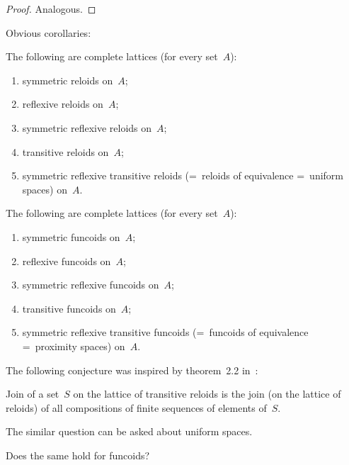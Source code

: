 \begin{proof}
Analogous.
\end{proof}

Obvious corollaries:

\begin{cor}
The following are complete lattices (for every set~$A$):
\begin{enumerate}
\item symmetric reloids on~$A$;
\item reflexive reloids on~$A$;
\item symmetric reflexive reloids on~$A$;
\item transitive reloids on~$A$;
\item symmetric reflexive transitive reloids (=~reloids of equivalence =~uniform spaces) on~$A$.
\end{enumerate}
\end{cor}

\begin{cor}
The following are complete lattices (for every set~$A$):
\begin{enumerate}
\item symmetric funcoids on~$A$;
\item reflexive funcoids on~$A$;
\item symmetric reflexive funcoids on~$A$;
\item transitive funcoids on~$A$;
\item symmetric reflexive transitive funcoids (=~funcoids of equivalence =~proximity spaces) on~$A$.
\end{enumerate}
\end{cor}

The following conjecture was inspired by theorem~2.2 in~\cite{Weber2007}:

\begin{conjecture}
Join of a set~$S$ on the lattice of transitive reloids is
the join (on the lattice of reloids) of all compositions of finite sequences of elements of~$S$.
\end{conjecture}

The similar question can be asked about uniform spaces.

Does the same hold for funcoids?